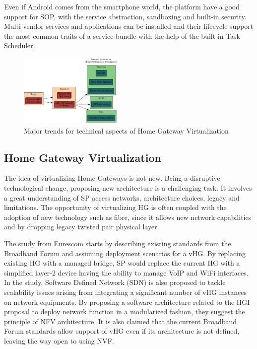 Even if Android comes from the smartphone world, the platform have a good support for SOP, with the service abstraction, sandboxing and built-in security. Multi-vendor services and applications can be installed and their lifecycle support the most common traits of a service bundle with the help of the built-in Task Scheduler.


\begin{figure}
  \begin{center}
    \includegraphics[width=0.45\textwidth]{fig/vhgtrends.pdf}
  \end{center}
  \caption{ Major trends for technical aspects of Home Gateway Virtualization
    \label{fig:trends}
  }
\end{figure}


\subsection{Home Gateway Virtualization}
The idea of virtualizing Home Gateways is not new.
Being a disruptive technological change, proposing new architecture is a challenging task.
It involves a great understanding of SP access networks, architecture choices, legacy and limitations.
The opportunity of virtualizing HG is often coupled with the adoption of new technology such as fibre, since it allows new network capabilities and by dropping legacy twisted pair physical layer.

The study from Eurescom \cite{daniel_abgrall_virtual_????} starts by describing existing standards from the Broadband Forum and assuming deployment scenarios for a vHG.
By replacing existing HG with a managed bridge, SP would replace the current HG with a simplified layer-2 device having the ability to manage VoIP and WiFi interfaces.
In the study, Software Defined Network (SDN) is also proposed to tackle scalability issues arising from integrating a significant number of vHG instances on network equipments.
By proposing a software architecture related to the HGI proposal to deploy network function in a modularized fashion, they suggest the principle of NFV architecture.
It is also claimed that the current Broadband Forum standards allow support of vHG even if its architecture is not defined, leaving the way open to using NVF.

